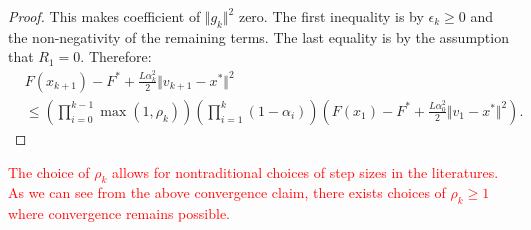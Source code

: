 \documentclass[12pt]{article}
\begin{document}
\begin{proof}
        This makes coefficient of $\Vert g_k\Vert^2$ zero. 
        The first inequality is by $\epsilon_k \ge 0$ and the non-negativity of the remaining terms. 
        The last equality is by the assumption that $R_1 = 0$. 
        Therefore: 
        {\small
        \begin{align*}
            & 
            F(x_{k + 1}) - F^* +
            \frac{L\alpha_k^2}{2}\Vert v_{k + 1} - x^*\Vert^2
            \\
            &\le 
            \left(
                \prod_{i = 0}^{k - 1} \max(1, \rho_{k})
            \right)
            \left(
                \prod_{i = 1}^{k} \left(1  - \alpha_i\right)
            \right)
            \left(
                F(x_1) - F^* + \frac{L\alpha_0^2}{2}\Vert v_1 - x^*\Vert^2
            \right). 
        \end{align*}
        }
    \end{proof}
    \begin{remark}        
        \textcolor{red}
        {
            The choice of $\rho_k$ allows for nontraditional choices of step sizes in the literatures. 
            As we can see from the above convergence claim, there exists choices of $\rho_k\ge 1$ where convergence remains possible. 
        }
    \end{remark}
\end{document}
